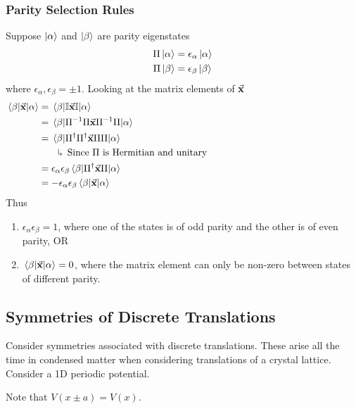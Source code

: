 \documentclass[12pt,a4paper,titlepage]{article}
\newcommand{\trm}[1]{\textrm{#1}} %
\newcommand{\explain}[1]{%
	\quad\rotatebox[origin=c]{180}{\enskip$\Lsh$}\hfill
	\begin{minipage}[t]{\dimexpr\linewidth-8em\relax}
	#1
	\end{minipage}\hspace{4em}\bigskip
}
\begin{document}
\subsubsection{Parity Selection Rules}
Suppose $\ket{\alpha}$ and $\ket{\beta}$ are parity eigenstates
\begin{equation}
\begin{aligned}
\Pi\ket{\alpha}&=\epsilon_{\alpha}\ket{\alpha}\\
\Pi\ket{\beta}&=\epsilon_{\beta}\ket{\beta}\\
\end{aligned}
\end{equation}
where $\epsilon_{\alpha},\epsilon_{\beta}=\pm1$. Looking at the matrix elements of $\vec{\vb{x}}$
\begin{equation}
\begin{aligned}
\mel{\beta}{\vec{\vb{x}}}{\alpha}&=\mel{\beta}{\mathbb{I}\vec{\vb{x}}\mathbb{I}}{\alpha}\\
&=\mel{\beta}{\Pi^{-1}\Pi\vec{\vb{x}}\Pi^{-1}\Pi}{\alpha}\\
&=\mel{\beta}{\Pi^{\dagger}\Pi^{\dagger}\vec{\vb{x}}\Pi\Pi}{\alpha}\\
&\quad\explain{Since $\Pi$ is Hermitian and unitary}\\
&=\epsilon_{\alpha}\epsilon_{\beta}\mel{\beta}{\Pi^{\dagger}\vec{\vb{x}}\Pi}{\alpha}\\
&=-\epsilon_{\alpha}\epsilon_{\beta}\mel{\beta}{\vec{\vb{x}}}{\alpha}
\end{aligned}
\end{equation}
Thus
\begin{enumerate}
\item
$\epsilon_{\alpha}\epsilon_{\beta}=1$, where one of the states is of odd parity and the other is of even parity, OR
\item
$\mel{\beta}{\vec{\vb{x}}}{\alpha}=0$, where the matrix element can only be non-zero between states of different parity.
\end{enumerate}

\subsection{Symmetries of Discrete Translations}
Consider symmetries associated with discrete translations. These arise all the time in condensed matter when considering translations of a crystal lattice. Consider a 1D periodic potential.
\begin{center}
\end{center}
Note that $V(x\pm a)=V(x)$.\\
\end{document}
